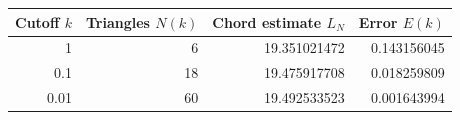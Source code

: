 \begin{tabular}{rrrr}
\toprule
Cutoff $k$ & Triangles $N(k)$ & Chord estimate $L_N$ & Error $E(k)$\\
\midrule
1 & 6 & 19.351021472 & 0.143156045 \\
0.1 & 18 & 19.475917708 & 0.018259809 \\
0.01 & 60 & 19.492533523 & 0.001643994 \\
\bottomrule
\end{tabular}
